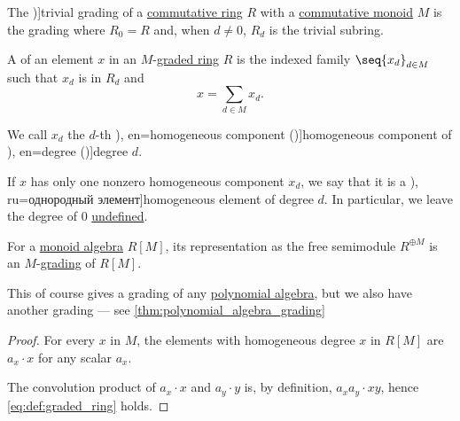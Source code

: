 \begin{definition}\label{def:trivial_ring_grading}
  The \term[en=trivial (graduation) (\cite[457]{Bourbaki1998Algebra1to3})]{trivial grading} of a \hyperref[def:ring/commutative]{commutative ring} \( R \) with a \hyperref[def:monoid/commutative]{commutative monoid} \( M \) is the grading where \( R_0 = R \) and, when \( d \neq 0 \), \( R_d \) is the trivial subring.
\end{definition}

\begin{definition}\label{def:homogeneous_element}
  A  of an element \( x \) in an \( M \)-\hyperref[def:graded_ring]{graded ring} \( R \) is the indexed family \( \seq{ x_d }_{d \in M} \) such that \( x_d \) is in \( R_d \) and
  \begin{equation}
    x = \sum_{d \in M} x_d.
  \end{equation}

  We call \( x_d \) the \( d \)-th \term[bg=еднородна компонента (\cite[57]{КоцевСидеров2016КомутативнаАлгебра}), en=homogeneous component (\cite[363]{Bourbaki1998Algebra1to3})]{homogeneous component} of \term[bg=степен (\cite[57]{КоцевСидеров2016КомутативнаАлгебра}), en=degree (\cite[363]{Bourbaki1998Algebra1to3})]{degree} \( d \).

  If \( x \) has only one nonzero homogeneous component \( x_d \), we say that it is a \term[bg=еднороден елемент (\cite[57]{КоцевСидеров2016КомутативнаАлгебра}), ru=однородный элемент]{homogeneous element} of degree \( d \). In particular, we leave the degree of \( 0 \) \hyperref[con:undefinedness]{undefined}.
\end{definition}

\begin{proposition}\label{thm:semigroup_algebra_grading}
  For a \hyperref[def:semigroup_algebra]{monoid algebra} \( R[M] \), its representation as the free semimodule \( R^{\oplus M} \) is an \( M \)-\hyperref[def:graded_ring]{grading} of \( R[M] \).
\end{proposition}
\begin{comments}
  \item This of course gives a grading of any \hyperref[def:polynomial_algebra]{polynomial algebra}, but we also have another grading --- see \cref{thm:polynomial_algebra_grading}
\end{comments}
\begin{proof}
  For every \( x \) in \( M \), the elements with homogeneous degree \( x \) in \( R[M] \) are \( a_x \cdot x \) for any scalar \( a_x \).

  The convolution product of \( a_x \cdot x \) and \( a_y \cdot y \) is, by definition, \( a_x a_y \cdot xy \), hence \eqref{eq:def:graded_ring} holds.
\end{proof}

